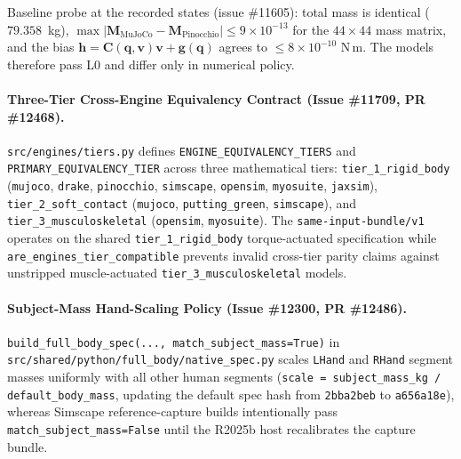 \documentclass[11pt,a4paper]{article}
\newcommand{\bM}{\mathbf{M}}
\newcommand{\bq}{\mathbf{q}}
\newcommand{\bv}{\mathbf{v}}
\newcommand{\bh}{\mathbf{h}}
\begin{document}
Baseline probe at the recorded states (issue \#11605): total mass is identical
($79.358$~kg), $\max|\bM_{\mathrm{MuJoCo}}-\bM_{\mathrm{Pinocchio}}|\le
9\times10^{-13}$ for the $44\times44$ mass matrix, and the bias
$\bh=\mathbf{C}(\bq,\bv)\bv+\mathbf{g}(\bq)$ agrees to $\le 8\times10^{-10}$
N\,m.  The models therefore pass L0 and differ only in numerical policy.

\paragraph{Three-Tier Cross-Engine Equivalency Contract (Issue \#11709, PR \#12468).}
\texttt{src/engines/tiers.py} defines \texttt{ENGINE\_EQUIVALENCY\_TIERS} and
\texttt{PRIMARY\_EQUIVALENCY\_TIER} across three mathematical tiers:
\texttt{tier\_1\_rigid\_body} (\texttt{mujoco}, \texttt{drake},
\texttt{pinocchio}, \texttt{simscape}, \texttt{opensim}, \texttt{myosuite},
\texttt{jaxsim}), \texttt{tier\_2\_soft\_contact} (\texttt{mujoco},
\texttt{putting\_green}, \texttt{simscape}), and
\texttt{tier\_3\_musculoskeletal} (\texttt{opensim}, \texttt{myosuite}).
The \texttt{same-input-bundle/v1} operates on the shared
\texttt{tier\_1\_rigid\_body} torque-actuated specification while
\texttt{are\_engines\_tier\_compatible} prevents invalid cross-tier parity
claims against unstripped muscle-actuated \texttt{tier\_3\_musculoskeletal}
models.

\paragraph{Subject-Mass Hand-Scaling Policy (Issue \#12300, PR \#12486).}
\texttt{build\_full\_body\_spec(..., match\_subject\_mass=True)} in
\texttt{src/shared/python/full\_body/native\_spec.py} scales \texttt{LHand} and
\texttt{RHand} segment masses uniformly with all other human segments
(\texttt{scale = subject\_mass\_kg / default\_body\_mass}, updating the
default spec hash from \texttt{2bba2beb} to \texttt{a656a18e}), whereas
Simscape reference-capture builds intentionally pass
\texttt{match\_subject\_mass=False} until the R2025b host recalibrates the
capture bundle.
\end{document}
